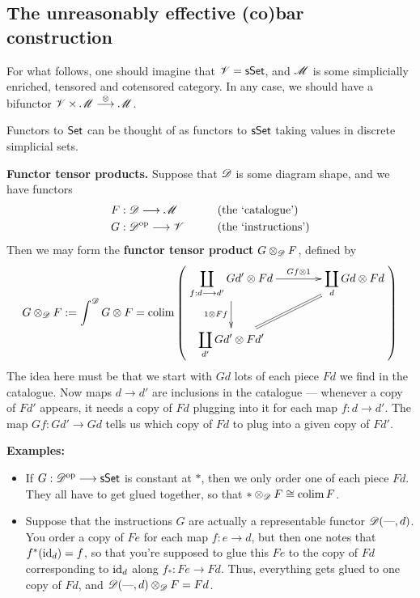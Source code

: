 \documentclass[11pt]{article}
\begin{document}
\begin{5. The unreasonably effective (co)bar construction}
\section*{The unreasonably effective (co)bar construction}
\begin{itemise}
\setlength{\parindent}{.25in}
\item For what follows, one should imagine that $\mathscr{V}=\operatorname{{\mathsf{sSet}}}$, and $\mathscr{M}$ is some simplicially enriched, tensored and cotensored category. In any case, we should have a bifunctor $\mathscr{V}\times \mathscr{M}\overset{\otimes }{\longrightarrow}\mathscr{M}$.
\item Functors to $\operatorname{{\mathsf{Set}}}$ can be thought of as functors to $\operatorname{{\mathsf{sSet}}}$ taking values in discrete simplicial sets.
\item \textbf{Functor tensor products.} Suppose that $\mathscr{D}$ is some diagram shape, and we have functors
\begin{alignat*}{2}
F
&:
\scrD\to\scrM%
&\qquad&\text{(the `catalogue')}\\
G
&:
\scrD^{\op}\to\scrV%
&\qquad&\text{(the `instructions')}
\end{alignat*}
Then we may form the \textbf{functor tensor product} ${G}\otimes_{\mathscr{D}}{F}$, defined by
\[{G}\otimes_{\scrD}{F}:=\int^{\scrD}G\otimes F=\colim\left(\vcenter{\xymatrix@C=1.4cm{
\displaystyle\coprod_{f:d\to d'}Gd'\otimes Fd
\ar[r]^-{Gf\otimes 1}
\ar[d]_-{1\otimes Ff}
&%
\displaystyle\coprod_{d}Gd\otimes Fd
\\%
\displaystyle\coprod_{d'}Gd'\otimes Fd'
\ar@{=}[ur]
&%
}}\right)\]
The idea here must be that we start with $Gd$ lots of each piece $Fd$ we find in the catalogue. Now maps $d\to d'$ are inclusions in the catalogue --- whenever a copy of $Fd'$ appears, it needs a copy of $Fd$ plugging into it for each map $f:d\to d'$. The map $Gf:Gd'\to Gd$ tells us which copy of $Fd$ to plug into a given copy of $Fd'$.
\item \textbf{Examples:}
\begin{itemize}\squishlist
\setlength{\parindent}{.25in}
\item If $G:\mathscr{D}^{\textup{op}}\longrightarrow\operatorname{{\mathsf{sSet}}}$ is constant at $*$, then we only order one of each piece $Fd$. They all have to get glued together, so that $*\otimes _{\mathscr{D}} F\cong\operatorname*{colim} F$.
\item Suppose that the instructions $G$ are actually a representable functor $\mathscr{D}(\textup{---} ,d)$. You order a copy of $Fe$ for each map $f:e\to d$, but then one notes that $f^*(\textup{id}_d)=f$, so that you're supposed to glue this $Fe$ to the copy of $Fd$ corresponding to $\textup{id}_d$ along $f_*:Fe\to Fd$. Thus, everything gets glued to one copy of $Fd$, and $\mathscr{D}(\textup{---} ,d)\otimes_{\mathscr{D}} F=Fd$.

\end{itemize}
\end{itemise}
\end{5. The unreasonably effective (co)bar construction}
\end{document}
